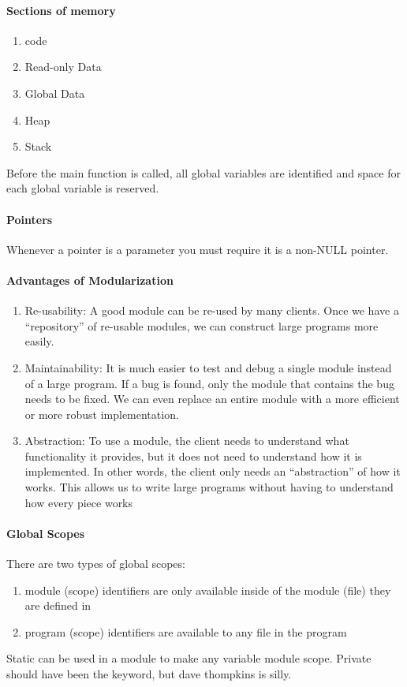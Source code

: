 \documentclass[10pt,letter]{article}
\begin{document}
\paragraph{Sections of memory}
\begin{enumerate}
    \item code
    \item Read-only Data
    \item Global Data
    \item Heap
    \item Stack
\end{enumerate}
Before the main function is called, all global variables are identified and space for each global variable is reserved. 

\paragraph{Pointers} Whenever a pointer is a parameter you must require it is a non-NULL pointer.

\paragraph{Advantages of Modularization}
\begin{enumerate}
    \item Re-usability: A good module can be re-used by many clients. Once
we have a “repository” of re-usable modules, we can construct large
programs more easily.
    \item Maintainability: It is much easier to test and debug a single module
instead of a large program. If a bug is found, only the module that
contains the bug needs to be fixed. We can even replace an entire
module with a more efficient or more robust implementation.
    \item Abstraction: To use a module, the client needs to understand what
functionality it provides, but it does not need to understand how it is
implemented. In other words, the client only needs an “abstraction”
of how it works. This allows us to write large programs without
having to understand how every piece works
\end{enumerate}

\paragraph{Global Scopes} There are two types of global scopes: \begin{enumerate}
    \item module (scope) identifiers are only available inside of the module (file)
they are defined in
\item program (scope) identifiers are available to any file in the program
\end{enumerate}
Static can be used in a module to make any variable module scope. Private should have been the keyword, but dave thompkins is silly.
\end{document}
